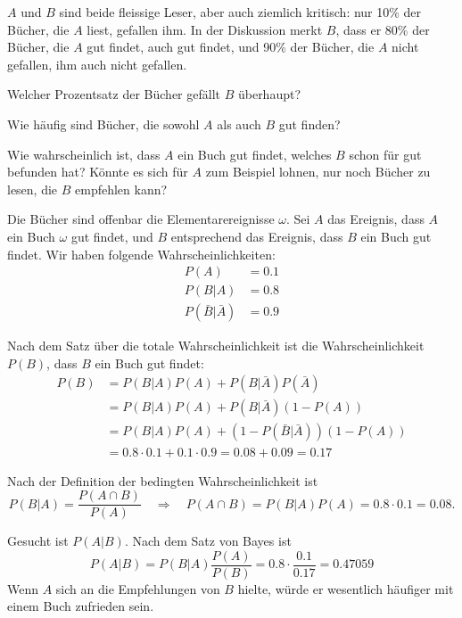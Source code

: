 $A$ und $B$ sind beide fleissige Leser, aber auch ziemlich
kritisch: nur 10\% der Bücher, die $A$ liest, gefallen ihm.
In der Diskussion merkt
$B$, dass er 80\% der Bücher, die $A$ gut findet, auch gut findet,
und 90\% der Bücher, die $A$ nicht gefallen, ihm auch nicht
gefallen.
\begin{teilaufgaben}
\item Welcher Prozentsatz der Bücher gefällt $B$ überhaupt?
\item Wie häufig sind Bücher, die sowohl $A$ als auch $B$ gut finden?
\item Wie wahrscheinlich ist, dass $A$ ein Buch gut findet, welches
$B$ schon für gut befunden hat? Könnte es sich für $A$ zum Beispiel
lohnen, nur noch Bücher zu lesen, die $B$ empfehlen kann?
\end{teilaufgaben}


\begin{loesung}
Die Bücher sind offenbar die Elementarereignisse $\omega$.
Sei $A$ das Ereignis, dass $A$ ein Buch $\omega$ gut findet,
und $B$ entsprechend das Ereignis, dass $B$ ein Buch gut findet.
Wir haben folgende Wahrscheinlichkeiten:
\begin{align*}
P(A)&=0.1\\
P(B|A)&=0.8\\
P(\bar B|\bar A)&=0.9
\end{align*}
\begin{teilaufgaben}
\item
Nach dem Satz über die totale Wahrscheinlichkeit ist die Wahrscheinlichkeit
$P(B)$, dass $B$ ein Buch gut findet:
\begin{align*}
P(B)
&=
P(B|A)P(A) + P(B|\bar A)P(\bar A)
\\
&=
P(B|A)P(A) + P(B|\bar A)(1-P(A))
\\
&=
P(B|A)P(A) + (1-P(\bar B|\bar A))(1-P(A))
\\
&=
0.8\cdot 0.1+0.1\cdot 0.9=0.08 + 0.09=0.17
\end{align*}
\item
Nach der Definition der bedingten Wahrscheinlichkeit
ist 
\[
P(B|A)=\frac{P(A\cap B)}{P(A)}
\quad\Rightarrow\quad
P(A\cap B)=P(B|A)P(A)=0.8\cdot 0.1=0.08.
\]
\item Gesucht ist $P(A|B)$. Nach dem Satz von Bayes ist
\[
P(A|B)=P(B|A)\frac{P(A)}{P(B)}=0.8\cdot\frac{0.1}{0.17}=0.47059
\]
Wenn $A$ sich an die Empfehlungen von $B$ hielte, würde er wesentlich
häufiger mit einem Buch zufrieden sein.
\qedhere
\end{teilaufgaben}
\end{loesung}

